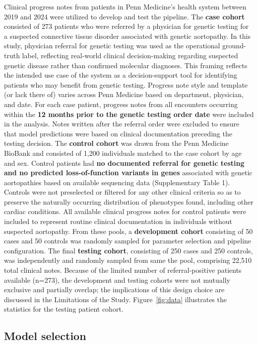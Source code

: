 \documentclass[fleqn,10pt]{wlscirep}
\begin{document}
Clinical progress notes from patients in Penn Medicine’s health system between 2019 and 2024 were utilized to develop and test the pipeline. The \textbf{case cohort} consisted of 273 patients who were referred by a physician for genetic testing for a suspected connective tissue disorder associated with genetic aortopathy. In this study, physician referral for genetic testing was used as the operational ground-truth label, reflecting real-world clinical decision-making regarding suspected genetic disease rather than confirmed molecular diagnoses. This framing reflects the intended use case of the system as a decision-support tool for identifying patients who may benefit from genetic testing. Progress note style and template (or lack there of) varies across Penn Medicine based on department, physician, and date. For each case patient, progress notes from all encounters occurring within the \textbf{12 months prior to the genetic testing order date} were included in the analysis. Notes written after the referral order were excluded to ensure that model predictions were based on clinical documentation preceding the testing decision.
The \textbf{control cohort} was drawn from the Penn Medicine BioBank\cite{verma2022penn} and consisted of 1,200 individuals matched to the case cohort by age and sex. Control patients had \textbf{no documented referral for genetic testing and no predicted loss-of-function variants in genes} associated with genetic aortopathies based on available sequencing data (Supplementary Table 1). Controls were not preselected or filtered for any other clinical criteria so as to preserve the naturally occurring distribution of phenotypes found, including other cardiac conditions. All available clinical progress notes for control patients were included to represent routine clinical documentation in individuals without suspected aortopathy. From these pools, a \textbf{development cohort} consisting of 50 cases and 50 controls was randomly sampled for parameter selection and pipeline configuration. The final \textbf{testing cohort}, consisting of 250 cases and 250 controls, was independently and randomly sampled from same the pool, comprising 22,510 total clinical notes. Because of the limited number of referral-positive patients available (n=273), the development and testing cohorts were not mutually exclusive and partially overlap; the implications of this design choice are discussed in the Limitations of the Study. Figure~\ref{fig:data} illustrates the statistics for the testing patient cohort.

\subsection*{Model selection}
\end{document}
